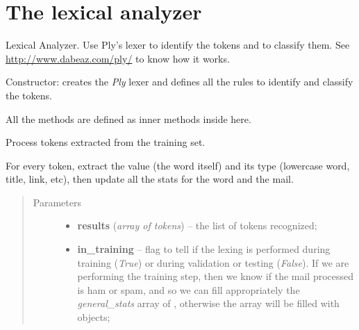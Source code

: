 \documentclass[letterpaper,10pt,english]{sphinxmanual}
\begin{document}
\section{The lexical analyzer}
\label{index:the-lexical-analyzer}\label{index:module-lexer}

\begin{fulllineitems}
\label{index:lexer.Lexer}
Lexical Analyzer. Use Ply's lexer to identify the tokens and to classify them.
See \href{http://www.dabeaz.com/ply/}{http://www.dabeaz.com/ply/} to know how it works.

\begin{fulllineitems}
\label{index:lexer.Lexer.__init__}
Constructor: creates the \emph{Ply} lexer and defines all the rules to identify
and classify the tokens.

All the  methods are defined as inner methods inside here.

\end{fulllineitems}


\begin{fulllineitems}
\label{index:lexer.Lexer._process_tokens}
Process tokens extracted from the training set.

For every token, extract the value (the word itself)
and its type (lowercase word, title, link, etc),
then update all the stats for the word and the mail.
\begin{quote}\begin{description}
\item[{Parameters}] \leavevmode\begin{itemize}
\item {} 
\textbf{results} (\emph{array of tokens}) -- the list of tokens recognized;

\item {} 
\textbf{in\_training} -- flag to tell if the lexing is performed during training            (\emph{True}) or during validation or testing (\emph{False}). If we are performing            the training step, then we know if the mail processed is ham or spam, and
so we can fill appropriately the \emph{general\_stats} array of
{\hyperref[index:gen_stat.Stat]{}}, otherwise the array will be filled with
 objects;


\end{itemize}
\end{description}
\end{quote}
\end{fulllineitems}
\end{fulllineitems}
\end{document}
